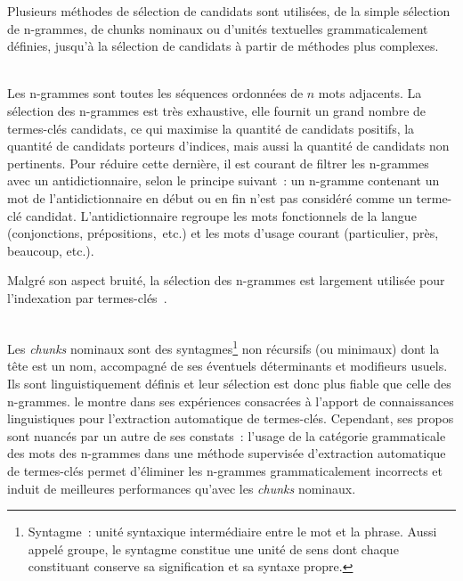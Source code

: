     Plusieurs méthodes de sélection de candidats sont utilisées, de la simple
    sélection de n-grammes, de chunks nominaux ou d'unités textuelles
    grammaticalement définies, jusqu'à la sélection de candidats à partir de
    méthodes plus complexes.

    ~\\Les n-grammes sont
    toutes les séquences ordonnées de $n$ mots adjacents. La sélection des
    n-grammes est très exhaustive, elle fournit un grand nombre de termes-clés
    candidats, ce qui maximise la quantité de candidats positifs, la quantité de
    candidats porteurs d'indices, mais aussi la quantité de candidats non
    pertinents. Pour réduire cette dernière, il est courant de filtrer les
    n-grammes avec un
    antidictionnaire, selon le principe suivant~: un n-gramme
    contenant un mot de l'antidictionnaire en début ou en fin n'est pas
    considéré comme un terme-clé candidat. L'antidictionnaire regroupe les mots
    fonctionnels de la langue (conjonctions, prépositions,~etc.) et les mots
    d'usage courant (\og{}particulier\fg{}, \og{}près\fg{}, \og{}beaucoup\fg{},
    etc.).
    
    Malgré son aspect bruité, la sélection des n-grammes est largement utilisée
    pour l'indexation par
    termes-clés~\cite{witten1999kea,hulth2003keywordextraction,medelyan2009humancompetitivetagging}.

    \begin{example}
    \end{example}

    ~\\Les \textit{chunks} nominaux
    sont des syntagmes\footnote{Syntagme~: unité syntaxique
    intermédiaire entre le mot et la phrase. Aussi appelé groupe, le syntagme
    constitue une unité de sens dont chaque constituant conserve sa
    signification et sa syntaxe propre.} non récursifs (ou minimaux) dont la
    tête est un nom, accompagné de ses éventuels déterminants et modifieurs
    usuels. Ils sont linguistiquement définis et leur sélection est donc plus
    fiable que celle des n-grammes.  le
    montre dans ses expériences consacrées à l'apport de connaissances
    linguistiques pour l'extraction automatique de termes-clés. Cependant, ses
    propos sont nuancés par un autre de ses constats~: l'usage de la catégorie
    grammaticale des mots des n-grammes dans une méthode supervisée d'extraction
    automatique de termes-clés permet d'éliminer les n-grammes grammaticalement
    incorrects et induit de meilleures performances qu'avec les \textit{chunks}
    nominaux.

